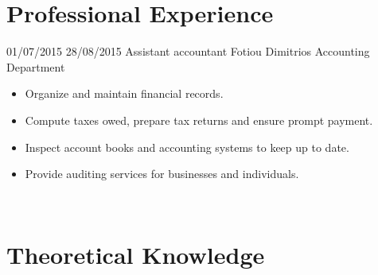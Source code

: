 \documentclass[letterpaper]{engineer_cv} %
\begin{document}

	\section{Professional Experience}

	\begin{longList} %
		\longListItem
			{01/07/2015}
			{28/08/2015}
			{Assistant accountant}
			{Fotiou Dimitrios Accounting Department}
			{}
			{\begin{itemize}
				\item Organize and maintain financial records.
				\item Compute taxes owed, prepare tax returns and ensure prompt payment.
                                \item Inspect account books and accounting systems to keep up to date.
                                \item Provide auditing services for businesses and individuals.
			\end{itemize}}
			\\
        \end{longList}


        \clearpage

	\infographics


	\section{Theoretical Knowledge}
\end{document}

